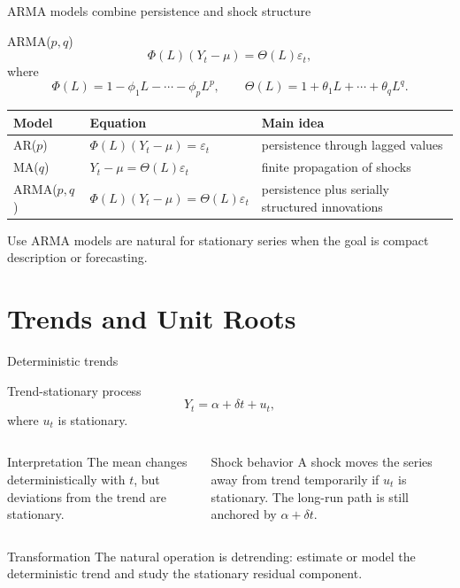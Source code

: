\documentclass[10pt]{beamer}
\newcommand{\eps}{\varepsilon}
\begin{document}
\begin{frame}{ARMA models combine persistence and shock structure}
\small
\begin{block}{ARMA($p,q$)}
\[
\Phi(L)(Y_t-\mu)=\Theta(L)\eps_t,
\]
where
\[
\Phi(L)=1-\phi_1L-\cdots-\phi_pL^p,
\qquad
\Theta(L)=1+\theta_1L+\cdots+\theta_qL^q.
\]
\end{block}

\begin{tabularx}{\textwidth}{p{}p{}Y}
\toprule
Model & Equation & Main idea \\
\midrule
AR($p$) & $\Phi(L)(Y_t-\mu)=\eps_t$ & persistence through lagged values \\
MA($q$) & $Y_t-\mu=\Theta(L)\eps_t$ & finite propagation of shocks \\
ARMA($p,q$) & $\Phi(L)(Y_t-\mu)=\Theta(L)\eps_t$ & persistence plus serially structured innovations \\
\bottomrule
\end{tabularx}

\pause
\begin{alertblock}{Use}
ARMA models are natural for stationary series when the goal is compact description or forecasting.
\end{alertblock}
\end{frame}

\section{Trends and Unit Roots}

\begin{frame}{Deterministic trends}
\label{slide:det_trend}
\small
\begin{block}{Trend-stationary process}
\[
Y_t=\alpha+\delta t+u_t,
\]
where $u_t$ is stationary.
\end{block}

\begin{columns}[T]
\begin{column}{0.49\textwidth}
\begin{exampleblock}{Interpretation}
The mean changes deterministically with $t$, but deviations from the trend are stationary.
\end{exampleblock}
\end{column}
\begin{column}{0.49\textwidth}
\begin{alertblock}{Shock behavior}
A shock moves the series away from trend temporarily if $u_t$ is stationary. The long-run path is still anchored by $\alpha+\delta t$.
\end{alertblock}
\end{column}
\end{columns}

\pause
\begin{block}{Transformation}
The natural operation is detrending: estimate or model the deterministic trend and study the stationary residual component.
\end{block}
\end{frame}
\end{document}
